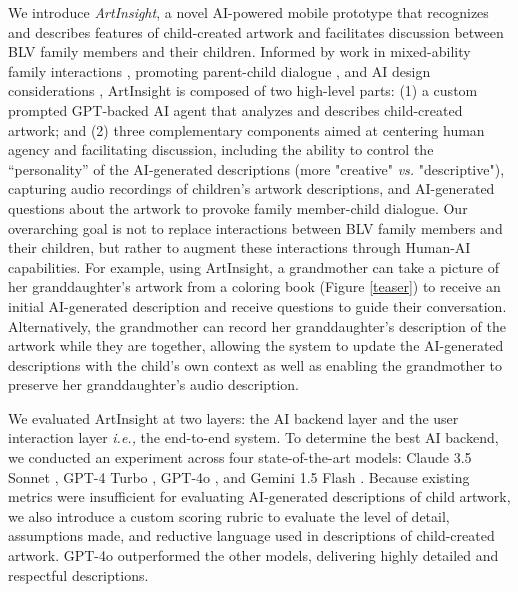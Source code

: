 \documentclass[sigconf]{acmart}
\begin{document}
We introduce \textit{ArtInsight}, a novel AI-powered mobile prototype that recognizes and describes features of child-created artwork and facilitates discussion between BLV family members and their children. Informed by work in mixed-ability family interactions \cite{cuddlingup, chhedakothary2024}, promoting parent-child dialogue \cite{Dietz_ContextQ, Zhang_StoryBuddy}, and AI design considerations \cite{GAI_DesignPrinciples, bennett_itscomplicated, darth_vader, Kim_DescriptionsForComics, Das_ProvenanceToAberrations}, ArtInsight is composed of two high-level parts: (1) a custom prompted GPT-backed AI agent that analyzes and describes child-created artwork; and (2) three complementary components aimed at centering human agency and facilitating discussion, including the ability to control the “personality” of the AI-generated descriptions (more "creative" \textit{vs.} "descriptive"), capturing audio recordings of children’s artwork descriptions, and AI-generated questions about the artwork to provoke family member-child dialogue. Our overarching goal is not to replace interactions between BLV family members and their children, but rather to augment these interactions through Human-AI capabilities. For example, using ArtInsight, a grandmother can take a picture of her granddaughter’s artwork from a coloring book (Figure \ref{teaser}) to receive an initial AI-generated description and receive questions to guide their conversation. Alternatively, the grandmother can record her granddaughter’s description of the artwork while they are together, allowing the system to update the AI-generated descriptions with the child's own context as well as enabling the grandmother to preserve her granddaughter's audio description.

We evaluated ArtInsight at two layers: the AI backend layer and the user interaction layer \textit{i.e.,} the end-to-end system. To determine the best AI backend, we conducted an experiment across four state-of-the-art models: Claude 3.5 Sonnet \cite{Claude35}, GPT-4 Turbo \cite{GPT-4Turbo}, GPT-4o \cite{GPT-4o}, and Gemini 1.5 Flash \cite{Gemini}. Because existing metrics were insufficient for evaluating AI-generated descriptions of child artwork, we also introduce a custom scoring rubric to evaluate the level of detail, assumptions made, and reductive language used in descriptions of child-created artwork. GPT-4o outperformed the other models, delivering highly detailed and respectful descriptions. 
\end{document}
